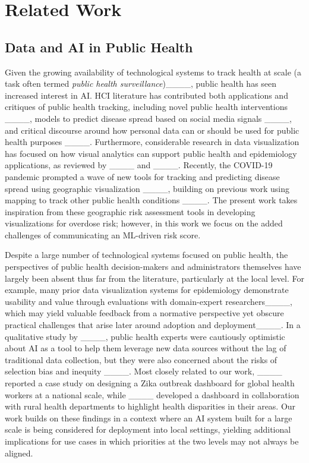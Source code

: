 \section{Related Work}
\subsection{Data and AI in Public Health}

Given the growing availability of technological systems to track health at scale (a task often termed \textit{public health surveillance})____, public health has seen increased interest in AI. 
HCI literature has contributed both applications and critiques of public health tracking, including novel public health interventions ____, models to predict disease spread based on social media signals ____, and critical discourse around how personal data can or should be used for public health purposes ____. 
Furthermore, considerable research in data visualization has focused on how visual analytics can support public health and epidemiology applications, as reviewed by ____ and ____.
Recently, the COVID-19 pandemic prompted a wave of new tools for tracking and predicting disease spread using geographic visualization ____, building on previous work using mapping to track other public health conditions ____. The present work takes inspiration from these geographic risk assessment tools in developing visualizations for overdose risk; however, in this work we focus on the added challenges of communicating an ML-driven risk score.

Despite a large number of technological systems focused on public health, the perspectives of public health decision-makers and administrators themselves have largely been absent thus far from the literature, particularly at the local level. 
For example, many prior data visualization systems for epidemiology demonstrate usability and value through evaluations with domain-expert researchers____, which may yield valuable feedback from a normative perspective yet obscure practical challenges that arise later around adoption and deployment____.
In a qualitative study by ____, public health experts were cautiously optimistic about AI as a tool to help them leverage new data sources without the lag of traditional data collection, but they were also concerned about the risks of selection bias and inequity ____. 
Most closely related to our work, ____ reported a case study on designing a Zika outbreak dashboard for global health workers at a national scale, while ____ developed a dashboard in collaboration with rural health departments to highlight health disparities in their areas.
Our work builds on these findings in a context where an AI system built for a large scale is being considered for deployment into local settings, yielding additional implications for use cases in which priorities at the two levels may not always be aligned.

